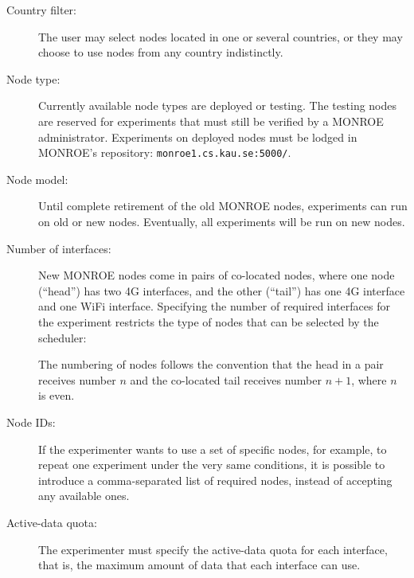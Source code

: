 \documentclass[a4paper,10pt]{article}
\newcommand{\monroe}{MONROE}
\newcommand{\identifier}[1]{{\texttt{\small{#1}}}}
\begin{document}
\begin{description}
	\item [Country filter:] The user may select nodes located in one or several countries, or they may choose to use nodes from any country indistinctly.
	\item [Node type:] %
	Currently available node types are deployed or testing.
	The testing nodes are reserved for experiments that must still be verified by a \monroe{} administrator.
	Experiments on deployed nodes must be lodged in \monroe{}'s repository: \identifier{monroe1.cs.kau.se:5000/}.
	\item [Node model:] Until complete retirement of the old \monroe{} nodes, experiments can run on old or new nodes. Eventually, all experiments will be run on new nodes.
	\item [Number of interfaces:] New \monroe{} nodes come in pairs of co-located nodes, where one node (``head'') has two 4G interfaces, and the other (``tail'') has one 4G interface and one WiFi interface.
	Specifying the number of required interfaces for the experiment restricts the type of nodes that can be selected by the scheduler:
	The numbering of nodes follows the convention that the head in a pair receives number $n$ and the co-located tail receives number $n+1$, where $n$ is even.
	\item [Node IDs:] If the experimenter wants to use a set of specific nodes, for example, to repeat one experiment under the very same conditions, it is possible to introduce a comma-separated list of required nodes, instead of accepting any available ones.
	\item [Active-data quota:] The experimenter must specify the active-data quota for each interface, that is, the maximum amount of data that each interface can use.

\end{description}
\end{document}
